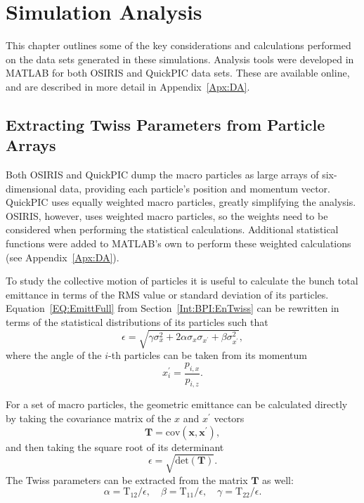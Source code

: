 %
%

\chapter{Simulation Analysis}
\label{Ch:SimA}

This chapter outlines some of the key considerations and calculations performed on the data sets generated in these simulations.
Analysis tools were developed in MATLAB for both OSIRIS and QuickPIC data sets.
These are available online, and are described in more detail in Appendix~\ref{Apx:DA}.

\section{Extracting Twiss Parameters from Particle Arrays}
\label{SimA:EnTwiss}

Both OSIRIS and QuickPIC dump the macro particles as large arrays of six-dimensional data, providing each particle's position and momentum vector.
QuickPIC uses equally weighted macro particles, greatly simplifying the analysis.
OSIRIS, however, uses weighted macro particles, so the weights need to be considered when performing the statistical calculations.
Additional statistical functions were added to MATLAB's own to perform these weighted calculations (see Appendix~\ref{Apx:DA}).

To study the collective motion of particles it is useful to calculate the bunch total emittance in terms of the RMS value or standard deviation of its particles.
Equation~\ref{EQ:EmittFull} from Section~\ref{Int:BPI:EnTwiss} can be rewritten in terms of the statistical distributions of its particles such that
\begin{equation}
    \epsilon = \sqrt{\gamma\sigma_{x}^{2} + 2\alpha\sigma_{x}\sigma_{x^{\prime}} + \beta\sigma_{x^{\prime}}^{2}}, \label{EQ:Emitt}
\end{equation}
where the angle of the $i$-th particles can be taken from its momentum
\begin{equation}
    x_{i}^{\prime} = \frac{p_{i,x}}{p_{i,z}}.
\end{equation}

For a set of macro particles, the geometric emittance can be calculated directly by taking the covariance matrix of the $x$ and $x^{\prime}$ vectors
\begin{equation}
    \mathbf{T} = \mathrm{cov}\left(\mathbf{x}, \mathbf{x}^{\prime}\right), \label{EQ:ECalc1}
\end{equation}
and then taking the square root of its determinant
\begin{equation}
    \epsilon = \sqrt{\mathrm{det}\left(\mathbf{T}\right)}. \label{EQ:ECalc2}
\end{equation}
The Twiss parameters can be extracted from the matrix $\mathbf{T}$ as well:
\begin{equation}
    \alpha = \mathrm{T}_{12}/\epsilon, \quad
    \beta  = \mathrm{T}_{11}/\epsilon, \quad
    \gamma = \mathrm{T}_{22}/\epsilon.
\end{equation}

